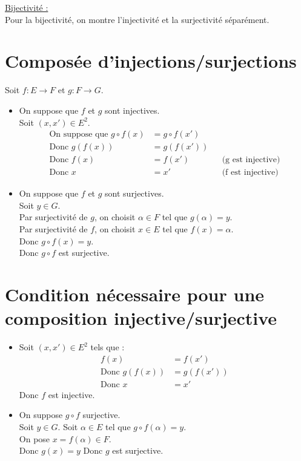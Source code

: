 \documentclass[../main.tex]{subfiles}
\begin{document}
\underline{Bijectivité :} \\
Pour la bijectivité, on montre l'injectivité et la surjectivité séparément.

\setcounter{section}{34}
\section{Composée d'injections/surjections}
Soit $f:E \rightarrow F$ et $g:F \rightarrow G$. 
\begin{itemize}
    \item On suppose que $f$ et $g$ sont injectives. \\
    Soit $(x, x') \in E^2$. \\
    \begin{align*}
        \text{On suppose que } g \circ f(x) &= g \circ f(x') \\
        \text{Donc } g(f(x)) &= g(f(x')) \\
        \text{Donc } f(x) &= f(x') && \text{(g est injective)}\\
        \text{Donc } x &= x' && \text{(f est injective)}
    \end{align*}
    
    \item On suppose que $f$ et $g$ sont surjectives. \\
    Soit $y \in G$. \\
    Par surjectivité de $g$, on choisit $\alpha \in F$ tel que $g(\alpha) = y$. \\
    Par surjectivité de $f$, on choisit $x \in E$ tel que $f(x) = \alpha$. \\
    Donc $g \circ f(x) = y$.\\
    Donc $g \circ f$ est surjective.
\end{itemize}

\section{Condition nécessaire pour une composition injective/surjective}
\begin{itemize}
    \item Soit $(x, x') \in E^2$ tels que :
    \begin{align*}
        f(x) &= f(x') \\
        \text{Donc } g(f(x)) &= g(f(x')) \\
        \text{Donc } x &= x'
    \end{align*}
    Donc $f$ est injective. \\

    \item On suppose $g \circ f$ surjective. \\
    Soit $y \in G$. Soit $\alpha \in E$ tel que $g \circ f(\alpha) = y$. \\
    On pose $x = f(\alpha) \in F$. \\
    Donc $g(x) = y$
    Donc $g$ est surjective.
\end{itemize}
\end{document}
